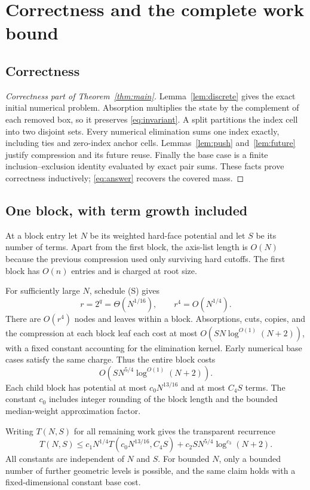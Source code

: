 \documentclass[12pt,a4paper]{article}
\theoremstyle{remark}
\newcommand{\1}{\mathbf1}
\begin{document}
\section{Correctness and the complete work bound}\label{sec:complexity}
\subsection{Correctness}
\begin{proof}[Correctness part of Theorem~\ref{thm:main}]
Lemma~\ref{lem:discrete} gives the exact initial numerical problem.
Absorption multiplies the state by the complement of each removed box,
so it preserves \eqref{eq:invariant}. A split partitions the index cell
into two disjoint sets. Every numerical elimination sums one index
exactly, including ties and zero-index anchor cells.
Lemmas~\ref{lem:push} and~\ref{lem:future} justify compression and its
future reuse. Finally the base case is a finite inclusion--exclusion
identity evaluated by exact pair sums. These facts prove correctness
inductively; \eqref{eq:answer} recovers the covered mass.
\end{proof}

\subsection{One block, with term growth included}
At a block entry let $N$ be its weighted hard-face potential and let
$S$ be its number of terms. Apart from the first block, the axis-list
length is $O(N)$ because the previous compression used only surviving
hard cutoffs. The first block has $O(n)$ entries and is charged at root size.

For sufficiently large $N$, schedule (S) gives
\[
             r=2^q=\Theta(N^{1/16}),\qquad
             r^4=O(N^{1/4}).
\]
There are $O(r^4)$ nodes and leaves within a block. Absorptions, cuts,
copies, and the compression at each block leaf each cost at most
$O(SN\log^{O(1)}(N+2))$, with a fixed constant accounting for the
elimination kernel. Early numerical base cases satisfy the same charge.
Thus the entire block costs
\begin{equation}
                    O(SN^{5/4}\log^{O(1)}(N+2)).     \label{eq:blockcost}
\end{equation}
Each child block has potential at most $c_0N^{13/16}$ and at most
$C_4S$ terms. The constant $c_0$ includes integer rounding of the block
length and the bounded median-weight approximation factor.

Writing $T(N,S)$ for all remaining work gives the transparent recurrence
\begin{equation}
 \boxed{\displaystyle
 T(N,S)\le c_1N^{1/4}T(c_0N^{13/16},C_4S)
                 +c_2SN^{5/4}\log^{c_3}(N+2).}
                                                        \label{eq:recurrence}
\end{equation}
All constants are independent of $N$ and $S$. For bounded $N$, only a
bounded number of further geometric levels is possible, and the same
claim holds with a fixed-dimensional constant base cost.
\end{document}

